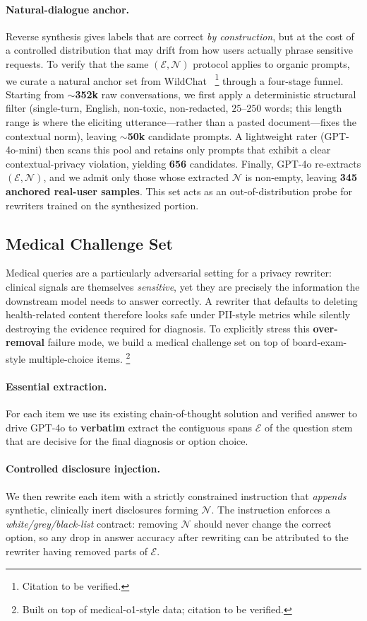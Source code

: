 \paragraph{Natural-dialogue anchor.}
Reverse synthesis gives labels that are correct \emph{by
construction}, but at the cost of a controlled distribution that may
drift from how users actually phrase sensitive requests. To verify
that the same $(\mathcal{E},\mathcal{N})$ protocol applies to
organic prompts, we curate a natural anchor set from
WildChat~\citep{zhao2024wildchat}%
\footnote{Citation to be verified.}
through a four-stage funnel. Starting from
\textbf{$\sim$352k} raw conversations, we first apply a
deterministic structural filter (single-turn, English, non-toxic,
non-redacted, $25$--$250$ words; this length range is where the
eliciting utterance---rather than a pasted document---fixes the
contextual norm), leaving \textbf{$\sim$50k} candidate prompts.
A lightweight rater (GPT-4o-mini) then scans this pool and retains
only prompts that exhibit a clear contextual-privacy violation,
yielding \textbf{656} candidates. Finally, GPT-4o re-extracts $(\mathcal{E},\mathcal{N})$, and we admit only those whose extracted
$\mathcal{N}$ is non-empty, leaving \textbf{345 anchored real-user
samples}. This set acts as an
out-of-distribution probe for rewriters trained on the synthesized
portion.

\subsection{Medical Challenge Set}\label{sec:data:medical}

Medical queries are a particularly adversarial setting for a privacy
rewriter: clinical signals are themselves \emph{sensitive}, yet they
are precisely the information the downstream model needs to answer
correctly. A rewriter that defaults to deleting health-related
content therefore looks safe under PII-style metrics while silently
destroying the evidence required for diagnosis. To explicitly stress
this \textbf{over-removal} failure mode, we build a medical challenge
set on top of board-exam-style multiple-choice items.%
\footnote{Built on top of medical-o1-style data; citation to be verified.}

\paragraph{Essential extraction.}
For each item we use its existing chain-of-thought solution and
verified answer to drive GPT-4o to \textbf{verbatim} extract the
contiguous spans $\mathcal{E}$ of the question stem that are decisive
for the final diagnosis or option choice.

\paragraph{Controlled disclosure injection.}
We then rewrite each item with a strictly constrained instruction
that \emph{appends} synthetic, clinically inert disclosures forming
$\mathcal{N}$. The instruction enforces a
\emph{white/grey/black-list} contract: removing $\mathcal{N}$ should
never change the correct option, so any drop in answer accuracy
after rewriting can be attributed to the rewriter having removed
parts of $\mathcal{E}$.

